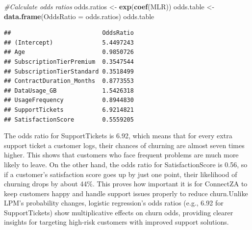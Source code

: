 \documentclass[
]{article}
\newenvironment{Shaded}{\begin{snugshade}}{\end{snugshade}}
\newcommand{\AttributeTok}[1]{\textcolor[rgb]{0.13,0.29,0.53}{#1}}
\newcommand{\CommentTok}[1]{\textcolor[rgb]{0.56,0.35,0.01}{\textit{#1}}}
\newcommand{\DecValTok}[1]{\textcolor[rgb]{0.00,0.00,0.81}{#1}}
\newcommand{\FloatTok}[1]{\textcolor[rgb]{0.00,0.00,0.81}{#1}}
\newcommand{\FunctionTok}[1]{\textcolor[rgb]{0.13,0.29,0.53}{\textbf{#1}}}
\newcommand{\NormalTok}[1]{#1}
\newcommand{\OtherTok}[1]{\textcolor[rgb]{0.56,0.35,0.01}{#1}}
\newcommand{\SpecialCharTok}[1]{\textcolor[rgb]{0.81,0.36,0.00}{\textbf{#1}}}
\newcommand{\StringTok}[1]{\textcolor[rgb]{0.31,0.60,0.02}{#1}}
\begin{document}
\begin{Shaded}
\begin{Highlighting}[]
\CommentTok{\#Calculate odds ratios}
\NormalTok{odds.ratios }\OtherTok{\textless{}{-}} \FunctionTok{exp}\NormalTok{(}\FunctionTok{coef}\NormalTok{(MLR))}
\NormalTok{odds.table }\OtherTok{\textless{}{-}} \FunctionTok{data.frame}\NormalTok{(}\AttributeTok{OddsRatio =}\NormalTok{ odds.ratios)}
\NormalTok{odds.table}
\end{Highlighting}
\end{Shaded}

\begin{verbatim}
##                          OddsRatio
## (Intercept)              5.4497243
## Age                      0.9850726
## SubscriptionTierPremium  0.3547544
## SubscriptionTierStandard 0.3518499
## ContractDuration_Months  0.8773553
## DataUsage_GB             1.5426318
## UsageFrequency           0.8944830
## SupportTickets           6.9214821
## SatisfactionScore        0.5559205
\end{verbatim}

\hfill\break
The odds ratio for SupportTickets is 6.92, which means that for every
extra support ticket a customer logs, their chances of churning are
almost seven times higher. This shows that customers who face frequent
problems are much more likely to leave. On the other hand, the odds
ratio for SatisfactionScore is 0.56, so if a customer's satisfaction
score goes up by just one point, their likelihood of churning drops by
about 44\%. This proves how important it is for ConnectZA to keep
customers happy and handle support issues properly to reduce
churn.Unlike LPM's probability changes, logistic regression's odds
ratios (e.g., 6.92 for SupportTickets) show multiplicative effects on
churn odds, providing clearer insights for targeting high-risk customers
with improved support solutions.\\

\begin{Shaded}
\end{Shaded}
\end{document}
